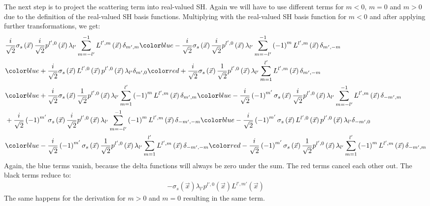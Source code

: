 \documentclass{egpubl}
\makeatletter
\def\mathcolor#1#{\@mathcolor{#1}}
\def\@mathcolor#1#2#3{%
  \protect\leavevmode
  \begingroup\color#1{#2}#3\endgroup
}
\makeatother
\begin{document}
The next step is to project the scattering term into real-valued SH. Again we will have to use different terms for $m<0$, $m=0$ and $m>0$ due to the definition of the real-valued SH basis functions. Multiplying with the real-valued SH basis function for $m<0$ and after applying further transformations, we get:
\begin{align*}
&
\frac{i}{\sqrt{2}}\sigma_s\left (\vec{x} \right )\frac{i}{\sqrt{2}}p^{{l',0}}\left (\vec{x} \right )\lambda_{{l'}}\sum_{m=-l'}^{-1}{L^{{l',m}}\left (\vec{x} \right )\delta_{m',m}}
\mathcolor{blue}
{
-\frac{i}{\sqrt{2}}\sigma_s\left (\vec{x} \right )\frac{i}{\sqrt{2}}p^{{l',0}}\left (\vec{x} \right )\lambda_{{l'}}\sum_{m=-l'}^{-1}{\left({-1}\right)^{m}L^{{l',m}}\left (\vec{x} \right )\delta_{m',-m}}
}
\\&
\mathcolor{blue}
{
+\frac{i}{\sqrt{2}}\sigma_s\left (\vec{x} \right )L^{{l',0}}\left (\vec{x} \right )p^{{l',0}}\left (\vec{x} \right )\lambda_{{l'}}\delta_{m',0}
}
\mathcolor{red}
{
+\frac{i}{\sqrt{2}}\sigma_s\left (\vec{x} \right )\frac{1}{\sqrt{2}}p^{{l',0}}\left (\vec{x} \right )\lambda_{{l'}}\sum_{m=1}^{l'}{L^{{l',m}}\left (\vec{x} \right )\delta_{m',-m}}
}
\\&
\mathcolor{blue}
{
+\frac{i}{\sqrt{2}}\sigma_s\left (\vec{x} \right )\frac{1}{\sqrt{2}}p^{{l',0}}\left (\vec{x} \right )\lambda_{{l'}}\sum_{m=1}^{l'}{\left({-1}\right)^{m}L^{{l',m}}\left (\vec{x} \right )\delta_{m',m}}
}
\mathcolor{blue}
{
-\frac{i}{\sqrt{2}}\left({-1}\right)^{m'}\sigma_s\left (\vec{x} \right )\frac{i}{\sqrt{2}}p^{{l',0}}\left (\vec{x} \right )\lambda_{{l'}}\sum_{m=-l'}^{-1}{L^{{l',m}}\left (\vec{x} \right )\delta_{-m',m}}
}
\\&
+\frac{i}{\sqrt{2}}\left({-1}\right)^{m'}\sigma_s\left (\vec{x} \right )\frac{i}{\sqrt{2}}p^{{l',0}}\left (\vec{x} \right )\lambda_{{l'}}\sum_{m=-l'}^{-1}{\left({-1}\right)^{m}L^{{l',m}}\left (\vec{x} \right )\delta_{-m',-m}}
\mathcolor{blue}
{
-\frac{i}{\sqrt{2}}\left({-1}\right)^{m'}\sigma_s\left (\vec{x} \right )L^{{l',0}}\left (\vec{x} \right )p^{{l',0}}\left (\vec{x} \right )\lambda_{{l'}}\delta_{-m',0}
}
\\&
\mathcolor{blue}
{
-\frac{i}{\sqrt{2}}\left({-1}\right)^{m'}\sigma_s\left (\vec{x} \right )\frac{1}{\sqrt{2}}p^{{l',0}}\left (\vec{x} \right )\lambda_{{l'}}\sum_{m=1}^{l'}{L^{{l',m}}\left (\vec{x} \right )\delta_{-m',-m}}
}
\mathcolor{red}
{
-\frac{i}{\sqrt{2}}\left({-1}\right)^{m'}\sigma_s\left (\vec{x} \right )\frac{1}{\sqrt{2}}p^{{l',0}}\left (\vec{x} \right )\lambda_{{l'}}\sum_{m=1}^{l'}{\left({-1}\right)^{m}L^{{l',m}}\left (\vec{x} \right )\delta_{-m',m}}
}
\end{align*}
Again, the blue terms vanish, because the delta functions will always be zero under the sum. The red terms cancel each other out. The black terms reduce to:
\begin{align*}
-\sigma_s\left(\vec{x}\right)\lambda_{l'}p^{l',0}\left(\vec{x}\right)L^{l',m'}\left(\vec{x}\right)
\end{align*}
The same happens for the derivation for $m>0$ and $m=0$ resulting in the same term.
\end{document}
